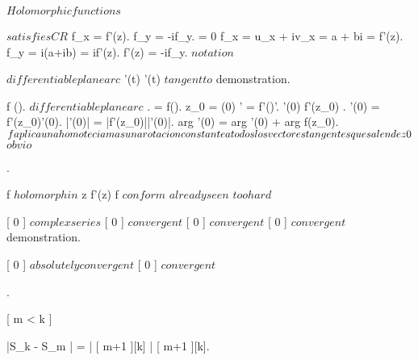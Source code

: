 \documentclass[../Main/main]{subfiles}
\begin{document}
\unit{ $ Holomorphic functions $ }
{
	
	{
		{
			 $ satisfies CR $
		}
		\holds
		{
			f_x = f'(z).
			f_y = -if_y.
			 = 0
		}
		\demonstration
		{
			f_x = u_x + iv_x = a + bi = f'(z).
			f_y = i(a+ib) = if'(z).
			f'(z) = -if_y.
			$notation$
		}
	}


	{
		{
			\gamma $ differentiable plane arc $ \suchthat {}
			{
				\gamma'(t) 
			}
		}
		\holds
		{
			\gamma'(t) $ tangent to $ \gamma
		}
		\demonstration
		{
			demonstration.
		}
	}


	{
		{
			f \in \Hc(\Uc).
			\gamma $ differentiable plane arc $ \suchthat \gamma \subset \Uc.
			\sigma = f(\gamma).
			z_0 = \gamma(0)
		}
		\holds
		{
			\sigma' = f'(\gamma)\gamma'.
			\gamma'(0)  \imp f'(z_0) .
			\sigma'(0) = f'(z_0)\gamma'(0).
			|\sigma'(0)| = |f'(z_0)||\gamma'(0)|.
			arg \sigma'(0) = arg \gamma'(0) + arg f(z_0).
			$ f aplica una homotecia mas una rotacion constante a todos los \\ vectores tangentes que salen de z0 $
		}
		\demonstration
		{
			$obvio$
		}
	}


	
	
	{
		{
			.
			
		}
		\holds
		{
			f $holomorph in $ z \suchthat f'(z)  \ifandonlyif f $ conform $
		}
		\demonstration
		{
			\rightway
			{
				$ already seen $
			}
			\leftway
			{
				$ too hard $
			}	
		}
	}

	{
		{
			[ 0 ] $ complex series $
		}
		\holds
		{
			[ 0 ] $ convergent $ \ifandonlyif {}[ 0 ] $ convergent $ \logicAnd {}[ 0 ] $ convergent $	
		}
		\demonstration
		{
			demonstration.
		}
	}
	
	
	
	
	{
		{
			[ 0 ] $ absolutely convergent $
		}
		\holds
		{
			[ 0 ] $ convergent $
		}
		\demonstration
		{
			.

			{
				|S_k - S_m | = | [ m+1 ][k] | \leq {}[ m+1 ][k].

}}}}
\end{document}
